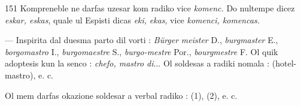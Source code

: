 \begin{VUpage}[155]{151}
Kompreneble  ne darfas uzesar kom radiko vice \textit{komenc.}\nl
Do nultempe dicez \textit{eskar, eskas}, quale ul Espisti dicas \textit{eki,}\nl
\textit{ekas}, vice \textit{komenci, komencas.}

 --- Inspirita dal duesma parto dil vorti : \textit{Bürger}\cc
\textit{meister} D., \textit{burgmaster} E., \textit{borgomastro} I., \textit{burgomaestre} S.,\nl
\textit{burgo-mestre} Por., \textit{bourgmestre} F. Ol quik adoptesis kun la\nl
senco : \textit{chefo, mastro di}... Ol soldesas a radiki nomala :\nl
{} (hotel-mastro),\nl
{} e. c.

Ol mem darfas okazione soldesar a verbal radiko :\nl
{} (1),  (2), e. c.
\end{VUpage}

